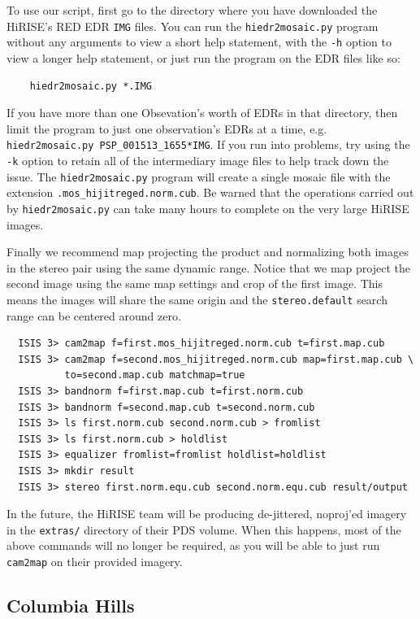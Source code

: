 To use our script, first go to the directory where you have downloaded
the HiRISE's RED EDR \texttt{IMG} files. You can run the 
\texttt{hiedr2mosaic.py} program without any arguments to view a short
help statement, with the \texttt{-h} option to view a longer help statement,
or just run the program on the EDR files like so:

\begin{verbatim}
    hiedr2mosaic.py *.IMG
\end{verbatim}

If you have more than one Obsevation's worth of EDRs in that
directory, then limit the program to just one observation's EDRs
at a time, e.g. \texttt{hiedr2mosaic.py PSP\_001513\_1655*IMG}.  If you
run into problems, try using the \texttt{-k} option to retain all of 
the intermediary image files to help track down the issue.  The
\texttt{hiedr2mosaic.py} program will create a single mosaic file 
with the extension \texttt{.mos\_hijitreged.norm.cub}.  Be warned that
the operations carried out by \texttt{hiedr2mosaic.py} can take many 
hours to complete on the very large HiRISE images.


Finally we recommend map projecting the product and normalizing both
images in the stereo pair using the same dynamic range. Notice that we
map project the second image using the same map settings and crop of
the first image. This means the images will share the same origin and
the {\tt stereo.default} search range can be centered around zero.

\begin{verbatim}
  ISIS 3> cam2map f=first.mos_hijitreged.norm.cub t=first.map.cub
  ISIS 3> cam2map f=second.mos_hijitreged.norm.cub map=first.map.cub \
          to=second.map.cub matchmap=true
  ISIS 3> bandnorm f=first.map.cub t=first.norm.cub
  ISIS 3> bandnorm f=second.map.cub t=second.norm.cub
  ISIS 3> ls first.norm.cub second.norm.cub > fromlist
  ISIS 3> ls first.norm.cub > holdlist
  ISIS 3> equalizer fromlist=fromlist holdlist=holdlist
  ISIS 3> mkdir result
  ISIS 3> stereo first.norm.equ.cub second.norm.equ.cub result/output
\end{verbatim}

In the future, the HiRISE team will be producing de-jittered, noproj'ed
imagery in the \texttt{extras/} directory of their \ac{PDS} volume.
When this happens, most of the above commands will no longer be required,
as you will be able to just run \texttt{cam2map} on their provided imagery.

\subsection{Columbia Hills}

